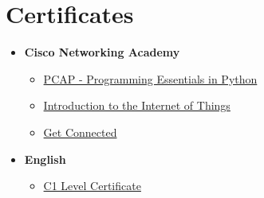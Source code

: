 \documentclass[letterpaper,11pt]{article}
\newcommand{\resumeSubHeadingListStart}{\begin{itemize}[leftmargin=*]}
\newcommand{\resumeSubHeadingListEnd}{\end{itemize}}
\begin{document}
\section{Certificates}
\resumeSubHeadingListStart
    \item{
        \textbf{Cisco Networking Academy}
        {
            \resumeSubHeadingListStart
                \item{\href{https://github.com/aleemont1/certificates/blob/main/PYTHON-2020_certificate.pdf}{PCAP - Programming Essentials in Python}}
                \item{\href{https://github.com/aleemont1/certificates/blob/main/IOT-2018_certificate.pdf}{Introduction to the Internet of Things}}
                \item{\href{https://github.com/aleemont1/certificates/blob/main/GetConnected-2017_certificate.pdf}{Get Connected}}
            \resumeSubHeadingListEnd
        }
    }
    \item{
        \textbf{English}
        {
            \resumeSubHeadingListStart
                \item{\href{https://github.com/aleemont1/certificates/blob/main/English_C1.pdf}{C1 Level Certificate}}
            \resumeSubHeadingListEnd
        }
    }
\resumeSubHeadingListEnd

\end{document}
